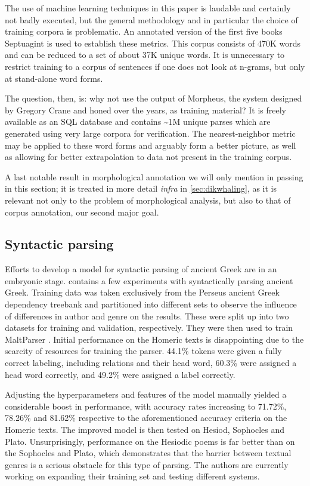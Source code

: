 The use of machine learning techniques in this paper is laudable and
certainly not badly executed, but the general methodology and in
particular the choice of training corpora is problematic. An annotated
version of the first five books Septuagint is used to establish these
metrics. This corpus consists of 470K words and can be reduced to a
set of about 37K unique words. It is unnecessary to restrict training
to a corpus of sentences if one does not look at n-grams, but only at
stand-alone word forms.

The question, then, is: why not use the output of Morpheus, the system
designed by Gregory Crane and honed over the years, as training
material? It is freely available as an SQL database and contains
\textasciitilde1M unique parses which are generated using very large
corpora for verification. The nearest-neighbor metric may be applied
to these word forms and arguably form a better picture, as well as
allowing for better extrapolation to data not present in the training
corpus.

A last notable result \citep{dik2008,dik2009} in morphological
annotation we will only mention in passing in this section; it is
treated in more detail \textit{infra} in \ref{sec:dikwhaling}, as
it is relevant not only to the problem of morphological analysis, but
also to that of corpus annotation, our second major goal.

\subsection{Syntactic parsing}
Efforts to develop a model for syntactic parsing of ancient Greek are
in an embryonic stage. \cite{mambrini2012} contains a few experiments
with syntactically parsing ancient Greek. Training data was taken
exclusively from the Perseus ancient Greek dependency treebank and
partitioned into different sets to observe the influence of
differences in author and genre on the results. These were split up
into two datasets for training and validation, respectively. They were
then used to train MaltParser \citep{nivre2006maltparser}. Initial
performance on the Homeric texts is disappointing due to the scarcity
of resources for training the parser. 44.1\% tokens were given a fully
correct labeling, including relations and their head word, 60.3\% were
assigned a head word correctly, and 49.2\% were assigned a label
correctly.

Adjusting the hyperparameters and features of the model manually
yielded a considerable boost in performance, with accuracy rates
increasing to 71.72\%, 78.26\% and 81.62\% respective to the
aforementioned accuracy criteria on the Homeric texts. The improved
model is then tested on Hesiod, Sophocles and Plato. Unsurprisingly,
performance on the Hesiodic poems is far better than on the Sophocles
and Plato, which demonstrates that the barrier between textual genres
is a serious obstacle for this type of parsing. The authors are
currently working on expanding their training set and testing
different systems.

